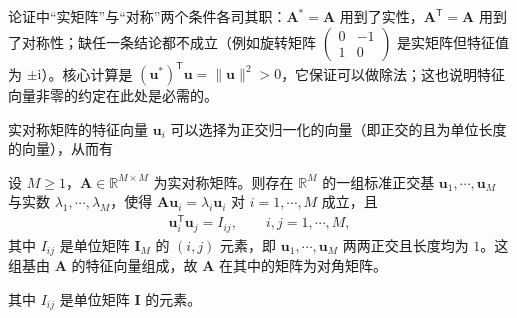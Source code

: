 \documentclass[../main.tex]{subfiles}
\begin{document}
\begin{remark}
论证中“实矩阵”与“对称”两个条件各司其职：$\bm{A}^{*}=\bm{A}$ 用到了实性，$\bm{A}^{\mathsf{T}}=\bm{A}$ 用到了对称性；缺任一条结论都不成立（例如旋转矩阵 $\begin{pmatrix}0&-1\\1&0\end{pmatrix}$ 是实矩阵但特征值为 $\pm\mathrm{i}$）。核心计算是 $(\bm{u}^{*})^{\mathsf{T}}\bm{u}=\|\bm{u}\|^{2}>0$，它保证可以做除法；这也说明特征向量非零的约定在此处是必需的。
\end{remark}

实对称矩阵的特征向量 $\bm{u}_i$ 可以选择为正交归一化的向量（即正交的且为单位长度的向量），从而有
\begin{proposition}[特征向量的正交归一性]\label{proposition:appA-特征向量正交}
设 $M\geqslant1$，$\bm{A}\in\mathbb{R}^{M\times M}$ 为实对称矩阵。则存在 $\mathbb{R}^{M}$ 的一组标准正交基 $\bm{u}_1,\cdots,\bm{u}_M$ 与实数 $\lambda_1,\cdots,\lambda_M$，使得 $\bm{A}\bm{u}_i=\lambda_i\bm{u}_i$ 对 $i=1,\cdots,M$ 成立，且
\begin{align}
  \bm{u}_i^{\mathsf{T}}\bm{u}_j=I_{ij},\qquad i,j=1,\cdots,M,
  \label{align:appA-正交归一}
\end{align}
其中 $I_{ij}$ 是单位矩阵 $\bm{I}_{M}$ 的 $(i,j)$ 元素，即 $\bm{u}_1,\cdots,\bm{u}_M$ 两两正交且长度均为 $1$。这组基由 $\bm{A}$ 的特征向量组成，故 $\bm{A}$ 在其中的矩阵为对角矩阵。
\end{proposition}

其中 $I_{ij}$ 是单位矩阵 $\bm{I}$ 的元素。
\end{document}
